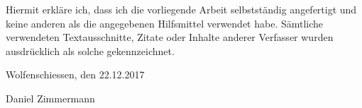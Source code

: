 
Hiermit erkläre ich, dass ich die vorliegende Arbeit selbstständig angefertigt und keine anderen als die
angegebenen Hilfsmittel verwendet habe. Sämtliche verwendeten Textausschnitte, Zitate oder Inhalte anderer
Verfasser wurden ausdrücklich als solche gekennzeichnet.

\vskip 1cm


Wolfenschiessen, den 22.12.2017

\vskip 1.5cm

Daniel Zimmermann